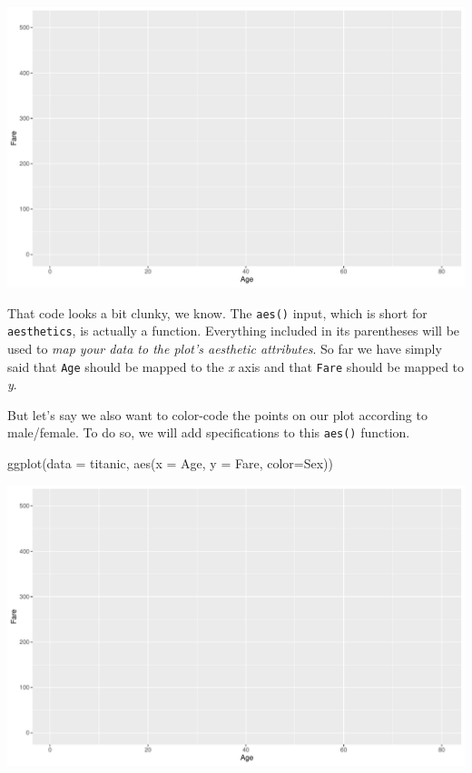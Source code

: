 \documentclass[
]{book}
\newenvironment{Shaded}{\begin{snugshade}}{\end{snugshade}}
\newcommand{\AttributeTok}[1]{\textcolor[rgb]{0.77,0.63,0.00}{#1}}
\newcommand{\FunctionTok}[1]{\textcolor[rgb]{0.00,0.00,0.00}{#1}}
\newcommand{\NormalTok}[1]{#1}
\begin{document}
\includegraphics{figures/unnamed-chunk-154-1.pdf}

That code looks a bit clunky, we know. The \texttt{aes()} input, which is short for \texttt{aesthetics}, is actually a function. Everything included in its parentheses will be used to \emph{map your data to the plot's aesthetic attributes}. So far we have simply said that \texttt{Age} should be mapped to the \emph{x} axis and that \texttt{Fare} should be mapped to \emph{y}.

But let's say we also want to color-code the points on our plot according to male/female. To do so, we will add specifications to this \texttt{aes()} function.

\begin{Shaded}
\begin{Highlighting}[]
\FunctionTok{ggplot}\NormalTok{(}\AttributeTok{data =}\NormalTok{ titanic, }
       \FunctionTok{aes}\NormalTok{(}\AttributeTok{x =}\NormalTok{ Age, }\AttributeTok{y =}\NormalTok{ Fare, }\AttributeTok{color=}\NormalTok{Sex))}
\end{Highlighting}
\end{Shaded}

\includegraphics{figures/unnamed-chunk-155-1.pdf}
\end{document}
